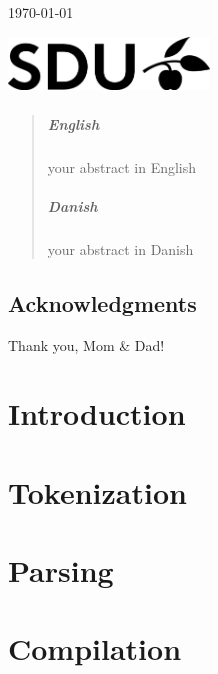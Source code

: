 \documentclass[a4paper,12pt]{report}
\begin{document}
\begin{titlepage}
\vfill\vfill

{\large\today} %

\vfill\vfill
\includegraphics[width=0.4\textwidth]{SDU_BLACK_RGB.png}\\[1cm]

\vfill

\end{titlepage}


\begin{abstract}
\paragraph{English}
your abstract in English

\paragraph{Danish}
your abstract in Danish
\end{abstract}

\newpage
\section*{Acknowledgments}
Thank you, Mom \& Dad!

\newpage
\tableofcontents

\newpage
{} 
\setcounter{page}{1}

\chapter{Introduction}

\chapter{Tokenization}

\chapter{Parsing}


\chapter{Compilation}

\end{document}
